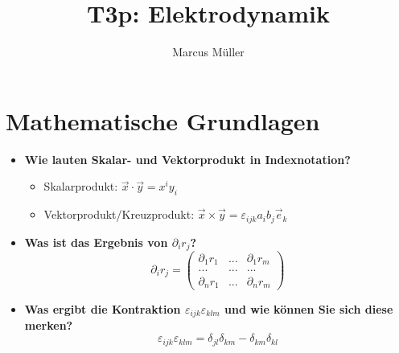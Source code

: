 \documentclass[german]{latex4ei/latex4ei_sheet}
\title{T3p: Elektrodynamik}
\author{Marcus Müller}
\begin{document}
\ifdefined\GitRevision{}\fi

\maketitle
\section{Mathematische Grundlagen}


	\begin{itemize}
		\item \textbf{Wie lauten Skalar- und Vektorprodukt in Indexnotation?} 
		\begin{itemize}
			\item Skalarprodukt: $\vec{x}\cdot\vec{y}=x^iy_i$ 
			\item Vektorprodukt/Kreuzprodukt: $\vec{x}\times\vec{y}=\varepsilon_{ijk}a_ib_j\vec{e}_k$
		\end{itemize}
		\item \textbf{Was ist das Ergebnis von $\partial_ir_j$?}
		\begin{equation}
			\partial_ir_j=\left(
			\begin{matrix}
  				\partial_1r_1 & ... &\partial_1r_m \\
 				... &... & ...\\
 				\partial_nr_1 &... & \partial_nr_m
			\end{matrix}\right)
		\end{equation}
		\item \textbf{Was ergibt die Kontraktion $\varepsilon_{ijk}\varepsilon_{klm}$ und wie können Sie sich diese merken?}
		\begin{equation}
			\varepsilon_{ijk}\varepsilon_{klm}=\delta_{jl}\delta_{km}-\delta_{km}\delta_{kl}
		\end{equation}
		

\end{itemize}
\end{document}
